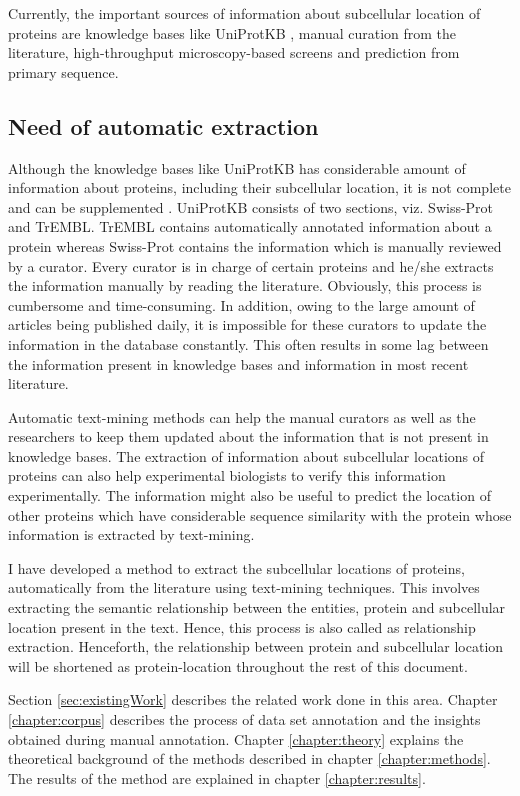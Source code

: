 Currently, the important sources of information about subcellular location of proteins are knowledge bases like UniProtKB \cite{magrane2011uniprot}, manual curation from the literature, high-throughput microscopy-based screens and prediction from primary sequence.

\subsection*{Need of automatic extraction}

Although the knowledge bases like UniProtKB \cite{magrane2011uniprot} has considerable amount of information about proteins, including their subcellular location, it is not complete and can be supplemented \cite{goldberg2015linked}. UniProtKB consists of two sections, viz. Swiss-Prot and TrEMBL. TrEMBL contains automatically annotated information about a protein whereas Swiss-Prot contains the information which is manually reviewed by a curator. Every curator is in charge of certain proteins and he/she extracts the information manually by reading the literature. Obviously, this process is cumbersome and time-consuming. In addition, owing to the large amount of articles being published daily, it is impossible for these curators to update the information in the database constantly. This often results in some lag between the information present in knowledge bases and information in most recent literature.

Automatic text-mining methods can help the manual curators as well as the researchers to keep them updated about the information that is not present in knowledge bases. The extraction of information about subcellular locations of proteins can also help experimental biologists to verify this information experimentally. The information might also be useful to predict the location of other proteins which have considerable sequence similarity with the protein whose information is extracted by text-mining.

I have developed a method to extract the subcellular locations of proteins, automatically from the literature using text-mining techniques. This involves extracting the semantic relationship between the entities, protein and subcellular location present in the text. Hence, this process is also called as relationship extraction. Henceforth, the relationship between protein and subcellular location will be shortened as protein-location throughout the rest of this document.

Section \ref{sec:existingWork} describes the related work done in this area. Chapter \ref{chapter:corpus} describes the process of data set annotation and the insights obtained during manual annotation. Chapter \ref{chapter:theory} explains the theoretical background of the methods described in chapter \ref{chapter:methods}. The results of the method are explained in chapter \ref{chapter:results}.

